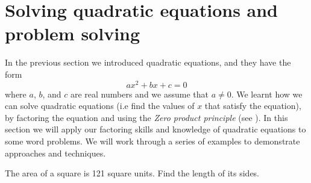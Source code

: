 \section{Solving quadratic equations and problem solving}\label{sec:solvequadfac}
In the previous section we introduced quadratic equations, and they have the form
\[
	ax^2+bx+c=0
\]
where $a$, $b$, and $c$ are real numbers and we assume that $a\ne 0$. We learnt how we
can solve quadratic equations (i.e find the values of $x$ that satisfy the equation), by
factoring the equation and using the {\em Zero product principle} (see 
). In this section we will apply 
our factoring skills and knowledge of quadratic equations to some word problems. We will work through
a series of examples to demonstrate approaches and techniques.

\begin{myexample}
The area of a square is 121 square units. Find the length of its sides.
\begin{center}
\end{center}

\end{myexample}
